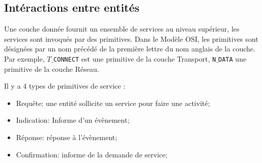 \subsection{Intéractions entre entités}
Une couche donnée fournit un ensemble de services au niveau supérieur, les services sont invoqués par des primitives. Dans le Modèle OSI, les primitives sont désignées par un nom précédé de la première lettre du nom anglais de la couche. Par exemple, \texttt{$T\_$CONNECT} est une primitive de la couche Transport, \texttt{N$\_$DATA} une primitive de la couche Réseau.

Il y a 4 types de primitives de service :
\begin{itemize}
	\item Requête: une entité sollicite un service pour faire   une activité;
	\item Indication: Informe d’un évènement;
	\item Réponse: réponse à l’évènement;
	\item Confirmation: informe de la demande de service;
\end{itemize}

